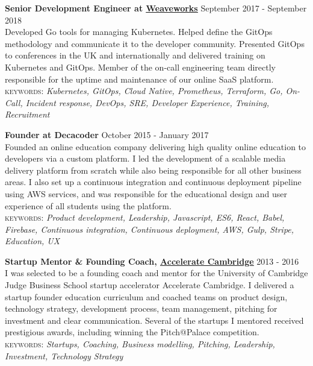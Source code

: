 \documentclass[10pt]{article}
\newcommand{\linkto}[2]{\href{#1}{\color{darkblue}\setulcolor{darkblue}\ul{#2}}}
\newcommand{\blankline}{\quad\pagebreak[2]}
\begin{document}
\blankline

\textbf{Senior Development Engineer at \linkto{https://weave.works}{Weaveworks}} \hfill September 2017 - September 2018\\
Developed Go tools for managing Kubernetes. Helped define the GitOps methodology and communicate it to the developer community. Presented GitOps to conferences in the UK and internationally and delivered training on Kubernetes and GitOps. Member of the on-call engineering team directly responsible for the uptime and maintenance of our online SaaS platform.\\
{\small \textsc{keywords:} \emph{Kubernetes, GitOps, Cloud Native, Prometheus, Terraform, Go, On-Call, Incident response, DevOps, SRE, Developer Experience, Training, Recruitment}}

\blankline


\textbf{Founder at Decacoder} \hfill October 2015 - January 2017\\
Founded an online education company delivering high quality online education to developers via a custom platform. I led the development of a scalable media delivery platform from scratch while also being responsible for all other business areas. I also set up a continuous integration and continuous deployment pipeline using AWS services, and was responsible for the educational design and user experience of all students using the platform. \\
{\small \textsc{keywords:} \emph{Product development, Leadership, Javascript, ES6, React, Babel, Firebase, Continuous integration, Continuous deployment, AWS, Gulp, Stripe, Education, UX}}

\blankline

\textbf{Startup Mentor \& Founding Coach, \linkto{https://www.jbs.cam.ac.uk/entrepreneurship/programmes/accelerate-cambridge/programmes/}{Accelerate Cambridge}}  \hfill 2013 - 2016\\
I was selected to be a founding coach and mentor for the University of Cambridge Judge Business School startup accelerator Accelerate Cambridge. I delivered a startup founder education curriculum and coached teams on product design, technology strategy, development process, team management, pitching for investment and clear communication. Several of the startups I mentored received prestigious awards, including winning the Pitch@Palace competition. \\
{\small \textsc{keywords:} \emph{Startups, Coaching, Business modelling, Pitching, Leadership, Investment, Technology Strategy}}
\end{document}
